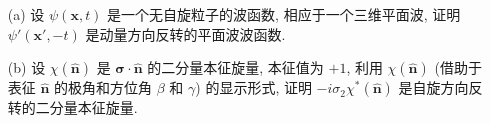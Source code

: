 \documentclass{assignment}
\begin{document}
\begin{prob}[课本习题 4.7]
    \begin{itemize}
        \item[(a)] 设 $\psi(\bm{x},t)$ 是一个无自旋粒子的波函数, 相应于一个三维平面波, 证明 $\psi'(\bm{x}',-t)$ 是动量方向反转的平面波波函数.
        \item[(b)] 设 $\chi(\hat{\bm{n}})$ 是 $\bm{\sigma}\cdot\hat{\bm{n}}$ 的二分量本征旋量, 本征值为 $+1$, 利用 $\chi(\hat{\bm{n}})$ (借助于表征 $\hat{\bm{n}}$ 的极角和方位角 $\beta$ 和 $\gamma$) 的显示形式, 证明 $-i\sigma_2\chi^*(\hat{\bm{n}})$ 是自旋方向反转的二分量本征旋量.
    \end{itemize}
\end{prob}
\begin{pf}

\end{pf}
\end{document}

